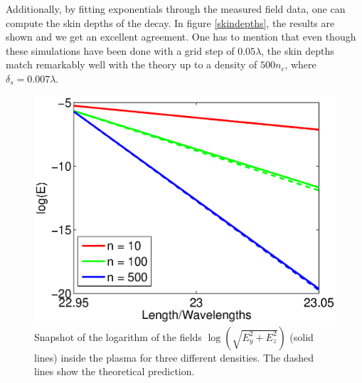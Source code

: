 \documentclass[conference]{IEEEtran}
\renewcommand{\~}{\widetilde }
\begin{document}
Additionally, by fitting exponentials through the measured field data, one can compute the skin depths of the decay. In figure \ref{skindepths}, the results are shown
and we get an excellent agreement. One has to mention that even though these simulations have been done with a grid step of $0.05 \lambda$,
the skin depths match remarkably well with the theory up to a density of $500 n_c$, where $\delta_s = 0.007 \lambda$.


\begin{figure}[H]
		\begin{center}
			\includegraphics[width=1.0\columnwidth]{ExpDecay.eps}
			\caption{Snapshot of the logarithm of the fields $\log(\sqrt{E_y^2+E_z^2})$ (solid lines) inside the plasma for three different densities. The dashed lines
				show the theoretical prediction.}
		\end{center}
\end{figure}
\end{document}
